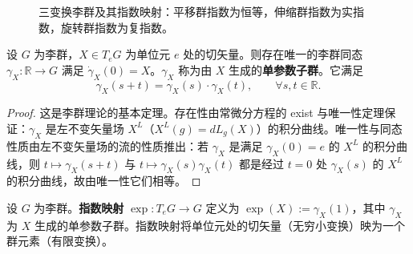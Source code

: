 \begin{figure}[htbp]
\centering
{}
\caption{三变换李群及其指数映射：平移群指数为恒等，伸缩群指数为实指数，旋转群指数为复指数。}
\label{fig:lie_groups}
\end{figure}

\begin{proposition}[单参数子群]\label{prop:one_parameter_subgroup}
设 $G$ 为李群，$X \in T_eG$ 为单位元 $e$ 处的切矢量。则存在唯一的李群同态 $\gamma_X: \mathbb{R} \to G$ 满足 $\dot{\gamma}_X(0) = X$。$\gamma_X$ 称为由 $X$ 生成的\textbf{单参数子群}。它满足
\[
\gamma_X(s + t) = \gamma_X(s) \cdot \gamma_X(t), \qquad \forall s, t \in \mathbb{R}.
\]
\end{proposition}

\begin{proof}
这是李群理论的基本定理。存在性由常微分方程的 exist 与唯一性定理保证：$\gamma_X$ 是左不变矢量场 $X^L$（$X^L(g) = dL_g(X)$）的积分曲线。唯一性与同态性质由左不变矢量场的流的性质推出：若 $\gamma_X$ 是满足 $\gamma_X(0) = e$ 的 $X^L$ 的积分曲线，则 $t \mapsto \gamma_X(s+t)$ 与 $t \mapsto \gamma_X(s)\gamma_X(t)$ 都是经过 $t=0$ 处 $\gamma_X(s)$ 的 $X^L$ 的积分曲线，故由唯一性它们相等。
\end{proof}

\begin{definition}[指数映射]\label{def:exponential_map}
设 $G$ 为李群。\textbf{指数映射} $\exp: T_eG \to G$ 定义为 $\exp(X) := \gamma_X(1)$，其中 $\gamma_X$ 为 $X$ 生成的单参数子群。指数映射将单位元处的切矢量（无穷小变换）映为一个群元素（有限变换）。
\end{definition}

